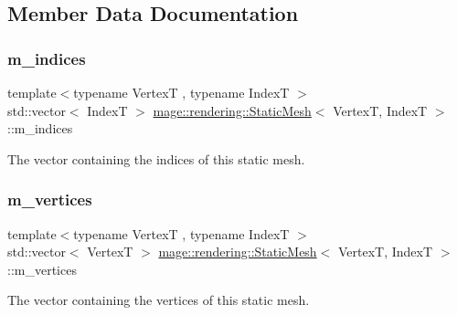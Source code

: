 \subsection{Member Data Documentation}
\mbox{\label{classmage_1_1rendering_1_1_static_mesh_a917240e2f91db85a7f03e8cca766fb26}} 
\subsubsection{\texorpdfstring{m\+\_\+indices}{m\_indices}}
{\footnotesize\ttfamily template$<$typename VertexT , typename IndexT $>$ \\
std\+::vector$<$ IndexT $>$ \mbox{\hyperlink{classmage_1_1rendering_1_1_static_mesh}{mage\+::rendering\+::\+Static\+Mesh}}$<$ VertexT, IndexT $>$\+::m\+\_\+indices\hspace{0.3cm}{\ttfamily [private]}}

The vector containing the indices of this static mesh. \mbox{\label{classmage_1_1rendering_1_1_static_mesh_ae34755a64d965a9e8c5d32c0c2371424}} 
\subsubsection{\texorpdfstring{m\+\_\+vertices}{m\_vertices}}
{\footnotesize\ttfamily template$<$typename VertexT , typename IndexT $>$ \\
std\+::vector$<$ VertexT $>$ \mbox{\hyperlink{classmage_1_1rendering_1_1_static_mesh}{mage\+::rendering\+::\+Static\+Mesh}}$<$ VertexT, IndexT $>$\+::m\+\_\+vertices\hspace{0.3cm}{\ttfamily [private]}}

The vector containing the vertices of this static mesh. 